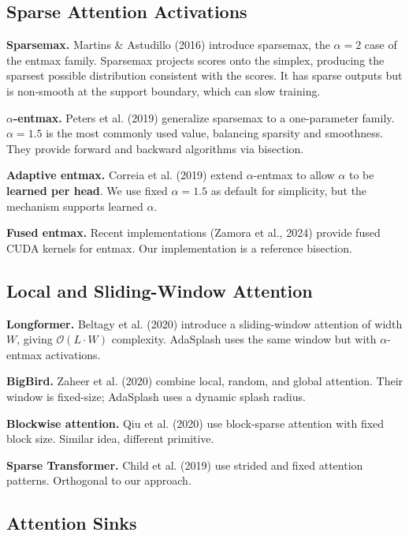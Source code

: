\subsection{Sparse Attention Activations}

\textbf{Sparsemax.} Martins \& Astudillo (2016) introduce sparsemax, the $\alpha = 2$ 
case of the entmax family. Sparsemax projects scores onto the simplex, 
producing the sparsest possible distribution consistent with the scores. It 
has sparse outputs but is non-smooth at the support boundary, which can slow 
training.

\textbf{$\alpha$-entmax.} Peters et al. (2019) generalize sparsemax to a one-parameter 
family. $\alpha = 1.5$ is the most commonly used value, balancing sparsity 
and smoothness. They provide forward and backward algorithms via bisection.

\textbf{Adaptive entmax.} Correia et al. (2019) extend $\alpha$-entmax to allow 
$\alpha$ to be \textbf{learned per head}. We use fixed $\alpha = 1.5$ as default 
for simplicity, but the mechanism supports learned $\alpha$.

\textbf{Fused entmax.} Recent implementations (Zamora et al., 2024) provide 
fused CUDA kernels for entmax. Our implementation is a reference bisection.

\subsection{Local and Sliding-Window Attention}

\textbf{Longformer.} Beltagy et al. (2020) introduce a sliding-window attention 
of width $W$, giving $\mathcal{O}(L \cdot W)$ complexity. AdaSplash uses the 
same window but with $\alpha$-entmax activations.

\textbf{BigBird.} Zaheer et al. (2020) combine local, random, and global attention. 
Their window is fixed-size; AdaSplash uses a dynamic splash radius.

\textbf{Blockwise attention.} Qiu et al. (2020) use block-sparse attention with 
fixed block size. Similar idea, different primitive.

\textbf{Sparse Transformer.} Child et al. (2019) use strided and fixed attention 
patterns. Orthogonal to our approach.

\subsection{Attention Sinks}

